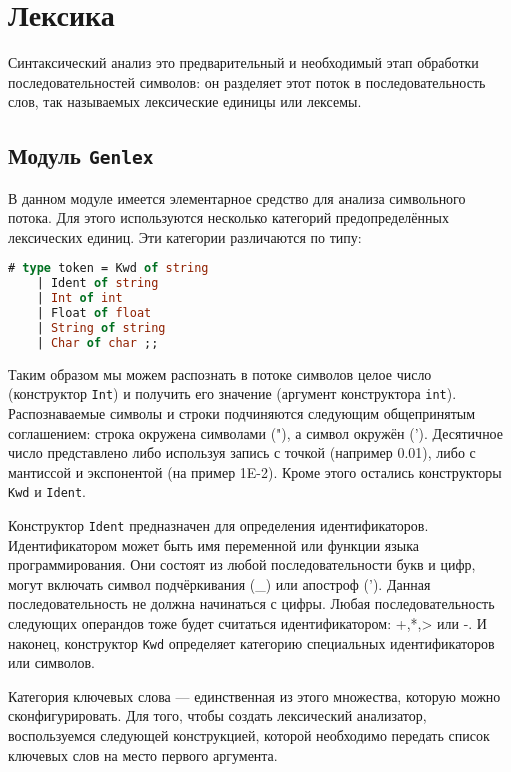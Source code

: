 \section{Лексика}

Синтаксический анализ это предварительный и необходимый этап обработки
последовательностей символов: он разделяет этот поток в последовательность слов,
так называемых лексические единицы или лексемы.

\subsection{Модуль \texttt{Genlex}}

В данном модуле имеется элементарное средство для анализа символьного потока.
Для этого используются несколько категорий предопределённых лексических единиц.
Эти категории различаются по типу:

\begin{lstlisting}[language=OCaml]
# type token = Kwd of string
    | Ident of string
    | Int of int
    | Float of float
    | String of string
    | Char of char ;;
\end{lstlisting}

Таким образом мы можем распознать в потоке символов целое число (конструктор
\texttt{Int}) и получить его значение (аргумент конструктора \texttt{int}).
Распознаваемые символы и строки подчиняются следующим общепринятым соглашением:
строка окружена символами ("), а символ окружён ('). Десятичное число
представлено либо используя запись с точкой (например 0.01), либо с мантиссой и
экспонентой (на пример 1E-2). Кроме этого остались конструкторы \texttt{Kwd} и
\texttt{Ident}.

Конструктор \texttt{Ident} предназначен для определения идентификаторов.
Идентификатором может быть имя переменной или функции языка программирования.
Они состоят из любой последовательности букв и цифр, могут включать
символ подчёркивания (\_) или апостроф ('). Данная последовательность не должна
начинаться с цифры. Любая последовательность следующих операндов тоже будет
считаться идентификатором: +,*,> или -. И наконец, конструктор \texttt{Kwd}
определяет
категорию специальных идентификаторов или символов.

Категория ключевых слова --- единственная из этого множества, которую можно
сконфигурировать. Для того, чтобы создать лексический анализатор, воспользуемся
следующей конструкцией, которой необходимо передать список ключевых слов на
место первого аргумента.


